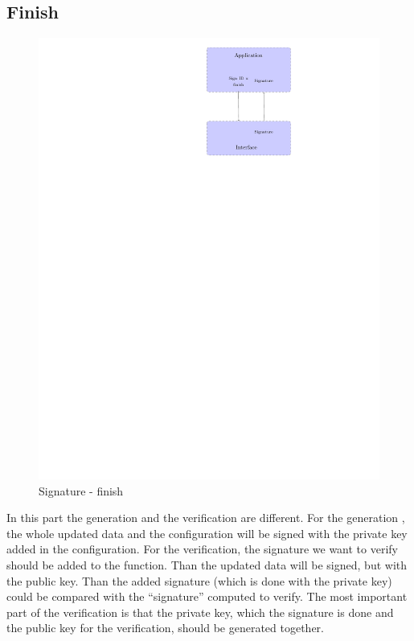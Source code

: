 \subsection*{Finish}
\begin{figure}[!ht]
\centering
\includegraphics[trim=18.5cm 20cm 9.5cm 0cm]{figures/sign_example_finish.pdf}
\caption{Signature - finish\newline}
\label{fig:gci_sign_finish}
\end{figure}
In this part the generation and the verification are different.\newline
For the generation , the whole updated data and the configuration will be signed
with the private key added in the configuration.\newline
For the verification, the signature we want to verify should be added to the
function.\newline
Than the updated data will be signed, but with the public key.\newline
Than the added signature (which is done with the private key) could be compared
with the ``signature'' computed to verify.\newline
The most important part of the verification is that the private key, which
the signature is done and the public key for the verification, should be
generated together.
\newpage

